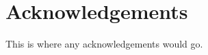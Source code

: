 \section{Acknowledgements}
This is where any acknowledgements would go.
\clearpage

\tableofcontents* %

\mainmatter

%
%
%
%

%
%
%
%
%





